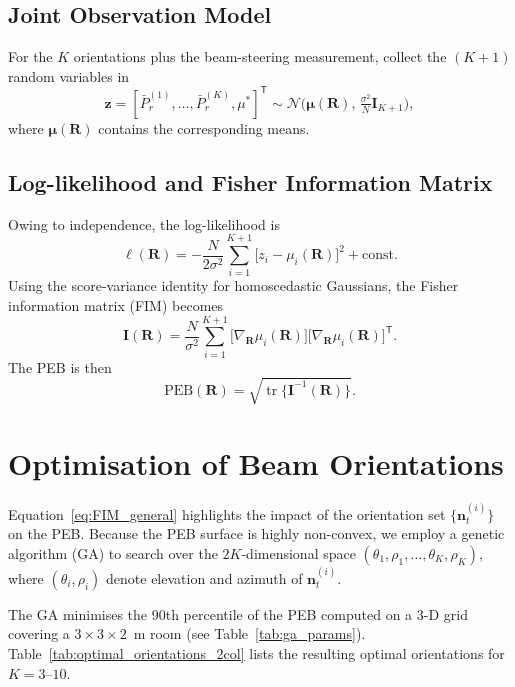 \documentclass[lettersize,journal]{IEEEtran}
\begin{document}
\subsection{Joint Observation Model}
For the $K$ orientations plus the beam-steering measurement, collect the $(K+1)$ random variables in
\[\mathbf z = [\bar P_r^{(1)},\dots,\bar P_r^{(K)},\mu^{\!*}]^{\mathsf T} \sim \mathcal N\!\bigl(\boldsymbol\mu(\mathbf R),\, \tfrac{\sigma^2}{N}\mathbf I_{K+1}\bigr),\]
where $\boldsymbol\mu(\mathbf R)$ contains the corresponding means.

\subsection{Log-likelihood and Fisher Information Matrix}
Owing to independence, the log-likelihood is
\begin{equation}
 \ell(\mathbf R) = -\frac{N}{2\sigma^{2}}\sum_{i=1}^{K+1}\bigl[z_i-\mu_i(\mathbf R)\bigr]^2 + \text{const}.\!
\end{equation}
Using the score-variance identity for homoscedastic Gaussians, the Fisher information matrix (FIM) becomes
\begin{equation}
 \mathbf I(\mathbf R) = \frac{N}{\sigma^{2}} \sum_{i=1}^{K+1} \bigl[\nabla_{\mathbf R}\mu_i(\mathbf R)\bigr]\bigl[\nabla_{\mathbf R}\mu_i(\mathbf R)\bigr]^{\mathsf T}.
\label{eq:FIM_general}
\end{equation}
The PEB is then
\begin{equation}
 \mathrm{PEB}(\mathbf R) = \sqrt{\operatorname{tr}\bigl\{\mathbf I^{-1}(\mathbf R)\bigr\}}.
\end{equation}

\section{Optimisation of Beam Orientations}
\label{sec:optimization}
Equation~\eqref{eq:FIM_general} highlights the impact of the orientation set $\{\mathbf n_t^{(i)}\}$ on the PEB.  Because the PEB surface is highly non-convex, we employ a genetic algorithm (GA) to search over the $2K$-dimensional space $(\theta_1,\rho_1,\dots,\theta_K,\rho_K)$, where $(\theta_i,\rho_i)$ denote elevation and azimuth of $\mathbf n_t^{(i)}$.

The GA minimises the 90th percentile of the PEB computed on a 3-D grid covering a $3\times3\times2$~m room (see Table~\ref{tab:ga_params}).  Table~\ref{tab:optimal_orientations_2col} lists the resulting optimal orientations for $K\!=\!3$–$10$.
\end{document}
